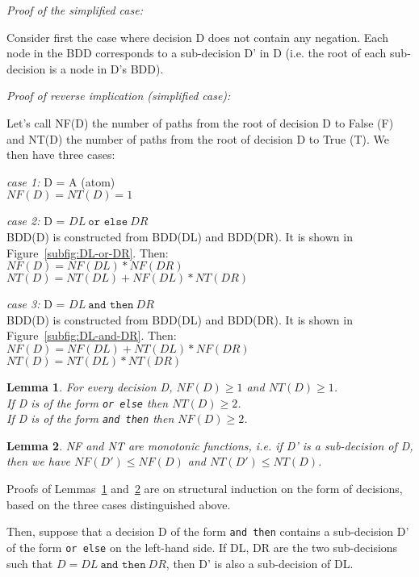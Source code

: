 \documentclass[a4paper,12pt,twoside]{article}
\renewcommand{\le}{\leqslant}
\renewcommand{\ge}{\geqslant}
\newcommand{\andthen}{\texttt{and then}}
\newcommand{\orelse}{\texttt{or else}}
\newtheorem{lemma}{Lemma}[subsection]
\begin{document}
\emph{Proof of the simplified case:}

Consider first the case where decision D does not contain any negation.
Each node in the BDD corresponds to a sub-decision D' in D
(i.e. the root of each sub-decision is a node in D's BDD).

\emph{Proof of reverse implication (simplified case):}

Let's call NF(D) the number of paths from the root of decision D to False (F)
and NT(D) the number of paths from the root of decision D to True (T). We
then have three cases:

\emph{case 1:} D = A (atom)\\
$NF(D) = NT(D) = 1$

\emph{case 2:} D = $DL \ \orelse{} \ DR$\\
BDD(D) is constructed from BDD(DL) and BDD(DR). It is shown
in Figure~\ref{subfig:DL-or-DR}. Then:\\
$NF(D) = NF(DL) * NF(DR)$\\
$NT(D) = NT(DL) + NF(DL) * NT(DR)$

\emph{case 3:} D = $DL \ \andthen{} \ DR$\\
BDD(D) is constructed from BDD(DL) and BDD(DR). It is shown
in Figure~\ref{subfig:DL-and-DR}. Then:\\
$NF(D) = NF(DL) + NT(DL) * NF(DR)$\\
$NT(D) = NT(DL) * NT(DR)$

\begin{lemma}
\label{lemma:NF-NT-bound}
For every decision D, $NF(D) \ge 1$ and $NT(D) \ge 1$.\\
If D is of the form \orelse{} then $NT(D) \ge 2$.\\
If D is of the form \andthen{} then $NF(D) \ge 2$.
\end{lemma}

\begin{lemma}
\label{lemma:NF-NT-monotonic}
NF and NT are monotonic functions, i.e. if D' is a sub-decision of D,
then we have
        $NF(D') \le NF(D)$
and
        $NT(D') \le NT(D)$.
\end{lemma}

Proofs of Lemmas~\ref{lemma:NF-NT-bound} and~\ref{lemma:NF-NT-monotonic} are on
structural induction on the form of decisions, based on the three cases
distinguished above.

Then, suppose that a decision D of the form \andthen{} contains a
sub-decision D' of the form \orelse{} on the left-hand side. If DL, DR
are the two sub-decisions such that $D = DL \ \andthen{} \ DR$, then D' is
also a sub-decision of DL.
\end{document}
